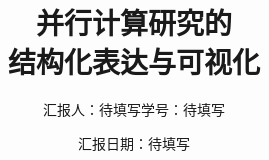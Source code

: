 \documentclass[aspectratio=169,11pt,fontset=none]{ctexbeamer}
\title[并行计算研究表达]{并行计算研究的\\结构化表达与可视化}
\author{汇报人：待填写\qquad 学号：待填写}
\institute{哈尔滨工业大学}
\date{汇报日期：待填写}
\begin{document}
\TitleSlide
\OutlineSlide




\hitappendix

\end{document}

